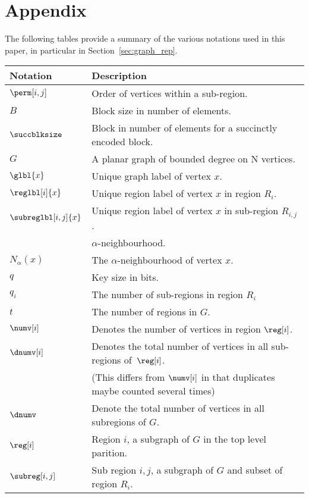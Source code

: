 \newpage
\section{Appendix}\label{sec_appendix}

The following tables provide a summary of the various notations used in this paper,
in particular in Section~\ref{sec:graph_rep}.

\begin{table*}[ht]
	\centering
		\begin{tabular}{ l | l}
			Notation & Description \\ \hline
			$\perm[i,j]$ & Order of vertices within a sub-region. \\
			$B$ & Block size in number of elements. \\
			$\succblksize$ & Block in number of elements for a succinctly encoded block. \\
			$G$ & A planar graph of bounded degree on N vertices. \\
			$\glbl{x}$ & Unique graph label of vertex $x$.\\
			$\reglbl[i]{x}$ & Unique region label of vertex $x$ in region $R_i$. \\
			$\subreglbl[i,j]{x}$ & Unique region label of vertex $x$ in sub-region $R_{i,j}$. \\
			& $\alpha$-neighbourhood. \\	
			$N_\alpha(x)$ & The $\alpha$-neighbourhood of vertex $x$. \\
			$q$ & Key size in bits. \\
			$q_i$ & The number of sub-regions in region $R_i$ \\
			$t$ & The number of regions in $G$. \\
			$\numv[i]$ & Denotes the number of vertices in region $\reg[i]$. \\
			$\dnumv[i]$ & Denotes the total number of vertices in all sub-regions of~$\reg[i]$.\\
			  & (This differs from $\numv[i]$ in that duplicates maybe counted several times)\\
			$\dnumv$ & Denote the total number of vertices in all subregions of $G$.\\
			$\reg[i]$ & Region $i$, a subgraph of $G$ in the top level parition. \\
			$\subreg[i,j]$ & Sub region $i,j$, a subgraph of $G$ and subset of region $R_i$. \\

\end{tabular}
\end{table*}
